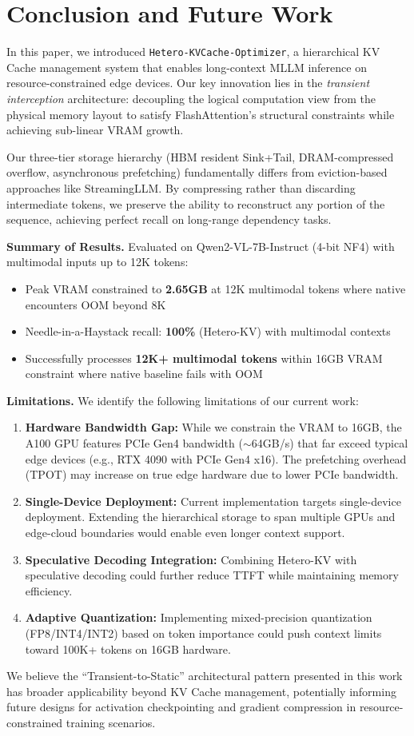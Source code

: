 \section{Conclusion and Future Work}
\label{sec:conclusion}

In this paper, we introduced \texttt{Hetero-KVCache-Optimizer}, a hierarchical KV Cache management system that enables long-context MLLM inference on resource-constrained edge devices. Our key innovation lies in the \textit{transient interception} architecture: decoupling the logical computation view from the physical memory layout to satisfy FlashAttention's structural constraints while achieving sub-linear VRAM growth.

Our three-tier storage hierarchy (HBM resident Sink+Tail, DRAM-compressed overflow, asynchronous prefetching) fundamentally differs from eviction-based approaches like StreamingLLM. By compressing rather than discarding intermediate tokens, we preserve the ability to reconstruct any portion of the sequence, achieving perfect recall on long-range dependency tasks.

\textbf{Summary of Results.} Evaluated on Qwen2-VL-7B-Instruct (4-bit NF4) with multimodal inputs up to 12K tokens:
\begin{itemize}
    \item Peak VRAM constrained to \textbf{2.65GB} at 12K multimodal tokens where native encounters OOM beyond 8K
    \item Needle-in-a-Haystack recall: \textbf{100\%} (Hetero-KV) with multimodal contexts
    \item Successfully processes \textbf{12K+ multimodal tokens} within 16GB VRAM constraint where native baseline fails with OOM
\end{itemize}

\textbf{Limitations.} We identify the following limitations of our current work:

\begin{enumerate}
    \item \textbf{Hardware Bandwidth Gap:} While we constrain the VRAM to 16GB, the A100 GPU features PCIe Gen4 bandwidth ($\sim$64GB/s) that far exceed typical edge devices (e.g., RTX 4090 with PCIe Gen4 x16). The prefetching overhead (TPOT) may increase on true edge hardware due to lower PCIe bandwidth.
    
    \item \textbf{Single-Device Deployment:} Current implementation targets single-device deployment. Extending the hierarchical storage to span multiple GPUs and edge-cloud boundaries would enable even longer context support.
    
    \item \textbf{Speculative Decoding Integration:} Combining Hetero-KV with speculative decoding could further reduce TTFT while maintaining memory efficiency.
    
    \item \textbf{Adaptive Quantization:} Implementing mixed-precision quantization (FP8/INT4/INT2) based on token importance could push context limits toward 100K+ tokens on 16GB hardware.
\end{enumerate}

We believe the ``Transient-to-Static'' architectural pattern presented in this work has broader applicability beyond KV Cache management, potentially informing future designs for activation checkpointing and gradient compression in resource-constrained training scenarios.
